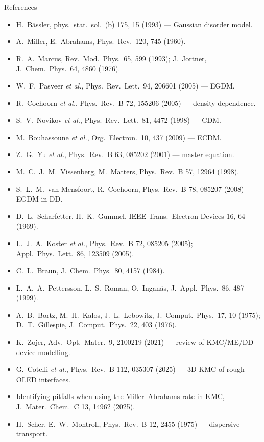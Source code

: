 \documentclass[aspectratio=169,10pt]{beamer}
\begin{document}
\begin{frame}[allowframebreaks]{References}
\footnotesize
\begin{itemize}
\item H.\ Bässler, phys.\ stat.\ sol.\ (b) 175, 15 (1993) --- Gaussian disorder model.
\item A.\ Miller, E.\ Abrahams, Phys.\ Rev.\ 120, 745 (1960).
\item R.\ A.\ Marcus, Rev.\ Mod.\ Phys.\ 65, 599 (1993); J.\ Jortner, J.\ Chem.\ Phys.\ 64, 4860 (1976).
\item W.\ F.\ Pasveer \emph{et al.}, Phys.\ Rev.\ Lett.\ 94, 206601 (2005) --- EGDM.
\item R.\ Coehoorn \emph{et al.}, Phys.\ Rev.\ B 72, 155206 (2005) --- density dependence.
\item S.\ V.\ Novikov \emph{et al.}, Phys.\ Rev.\ Lett.\ 81, 4472 (1998) --- CDM.
\item M.\ Bouhassoune \emph{et al.}, Org.\ Electron.\ 10, 437 (2009) --- ECDM.
\item Z.\ G.\ Yu \emph{et al.}, Phys.\ Rev.\ B 63, 085202 (2001) --- master equation.
\item M.\ C.\ J.\ M.\ Vissenberg, M.\ Matters, Phys.\ Rev.\ B 57, 12964 (1998).
\item S.\ L.\ M.\ van Mensfoort, R.\ Coehoorn, Phys.\ Rev.\ B 78, 085207 (2008) --- EGDM in DD.
\item D.\ L.\ Scharfetter, H.\ K.\ Gummel, IEEE Trans.\ Electron Devices 16, 64 (1969).
\item L.\ J.\ A.\ Koster \emph{et al.}, Phys.\ Rev.\ B 72, 085205 (2005); Appl.\ Phys.\ Lett.\ 86, 123509 (2005).
\item C.\ L.\ Braun, J.\ Chem.\ Phys.\ 80, 4157 (1984).
\item L.\ A.\ A.\ Pettersson, L.\ S.\ Roman, O.\ Inganäs, J.\ Appl.\ Phys.\ 86, 487 (1999).
\item A.\ B.\ Bortz, M.\ H.\ Kalos, J.\ L.\ Lebowitz, J.\ Comput.\ Phys.\ 17, 10 (1975); D.\ T.\ Gillespie, J.\ Comput.\ Phys.\ 22, 403 (1976).
\item K.\ Zojer, Adv.\ Opt.\ Mater.\ 9, 2100219 (2021) --- review of KMC/ME/DD device modelling.
\item G.\ Cotelli \emph{et al.}, Phys.\ Rev.\ B 112, 035307 (2025) --- 3D KMC of rough OLED interfaces.
\item Identifying pitfalls when using the Miller--Abrahams rate in KMC, J.\ Mater.\ Chem.\ C 13, 14962 (2025).
\item H.\ Scher, E.\ W.\ Montroll, Phys.\ Rev.\ B 12, 2455 (1975) --- dispersive transport.

\end{itemize}
\end{frame}
\end{document}
